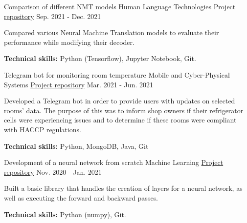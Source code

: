 \begin{cventries}
\cventry
{Comparison of different NMT models} %
{Human Language Technologies} %
{\href{https://github.com/nikodallanoce/NeuralMachineTranslation}{\faGithubSquare Project repository}} %
{Sep. 2021 - Dec. 2021} %
{
    \begin{cvitems}
        \item{Compared various Neural Machine Translation models to evaluate their performance while modifying their decoder.}
        \item{\textbf{Technical skills:} Python (Tensorflow), Jupyter Notebook, Git.} 
    \end{cvitems}
}

\cventry
{Telegram bot for monitoring room temperature} %
{Mobile and Cyber-Physical Systems} %
{\href{https://github.com/RistoAle97/BotTelegramMCPS}{\faGithubSquare Project repository}} %
{Mar. 2021 - Jun. 2021} %
{
    \begin{cvitems}
        \item{Developed a Telegram bot in order to provide users with updates on selected rooms' data. The purpose of this was to inform shop owners if their refrigerator cells were experiencing issues and to determine if these rooms were compliant with HACCP regulations.}
        \item{\textbf{Technical skills:} Python, MongoDB, Java, Git}
    \end{cvitems}
}

\cventry
{Development of a neural network from scratch} %
{Machine Learning} %
{\href{https://github.com/nikodallanoce/MLProject}{\faGithubSquare Project repository}} %
{Nov. 2020 - Jan. 2021} %
{
    \begin{cvitems}
        \item{Built a basic library that handles the creation of layers for a neural network, as well as executing the forward and backward passes.}
        \item{\textbf{Technical skills:} Python (numpy), Git.}
    \end{cvitems}
}

\end{cventries}
